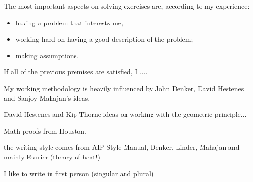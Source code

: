 The most important aspects on solving exercises are, according to my experience:
%
\begin{itemize}
%
\item having a problem that interests me;
%
\item working hard on having a good description of the problem;
%
\item making assumptions.
%
\end{itemize}
%
If all of the previous premises are satisfied, I ....

My working methodology is heavily influenced by John Denker, David Hestenes and Sanjoy Mahajan's ideas.

David Hestenes and Kip Thorne ideas on working with the geometric principle...

Math proofs from Houston.

the writing style comes from AIP Style Manual, Denker, Linder, Mahajan and mainly Fourier (theory of heat!).

I like to write in first person (singular and plural)
%
~


